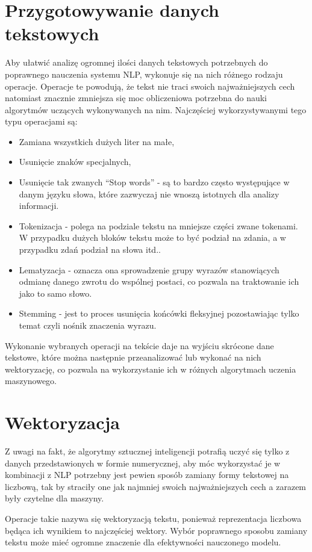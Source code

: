 \section{Przygotowywanie danych tekstowych}
Aby ułatwić analizę ogromnej ilości danych tekstowych potrzebnych do poprawnego nauczenia systemu NLP,
wykonuje się na nich różnego rodzaju operacje. Operacje te powodują, że tekst nie traci swoich najważniejszych cech 
natomiast znacznie zmniejsza się moc obliczeniowa potrzebna do nauki algorytmów uczących wykonywanych na nim. 
Najczęściej wykorzystywanymi tego typu operacjami są: 
\begin{itemize}
    \item Zamiana wszystkich dużych liter na małe,
    \item Usunięcie znaków specjalnych,
    \item Usunięcie tak zwanych ``Stop words'' - są to bardzo często występujące w danym języku słowa, które 
    zazwyczaj nie wnoszą istotnych dla analizy informacji.
    \item Tokenizacja - polega na podziale tekstu na mniejsze części zwane tokenami. W przypadku dużych bloków 
    tekstu może to być podział na zdania, a w przypadku zdań podział na słowa itd..
    \item Lematyzacja - oznacza ona sprowadzenie grupy wyrazów stanowiących odmianę danego zwrotu do wspólnej postaci,
    co pozwala na traktowanie ich jako to samo słowo.
    \item Stemming - jest to proces usunięcia końcówki fleksyjnej pozostawiając tylko temat czyli nośnik znaczenia 
    wyrazu.
\end{itemize}
Wykonanie wybranych operacji na tekście daje na wyjściu skrócone dane tekstowe, które można następnie przeanalizować lub 
wykonać na nich wektoryzację, co pozwala na wykorzystanie ich w różnych algorytmach uczenia maszynowego. 
\section{Wektoryzacja}
Z uwagi na fakt, że algorytmy sztucznej inteligencji potrafią uczyć się tylko z danych przedstawionych w formie numerycznej, aby móc 
wykorzystać je w kombinacji z NLP potrzebny jest pewien sposób zamiany formy tekstowej na liczbową, tak by straciły one jak najmniej
swoich najważniejszych cech a zarazem były czytelne dla maszyny. 

Operacje takie nazywa się wektoryzacją tekstu, ponieważ 
reprezentacja liczbowa będąca ich wynikiem to najczęściej wektory. 
Wybór poprawnego sposobu zamiany tekstu może mieć ogromne znaczenie dla efektywności nauczonego modelu.

